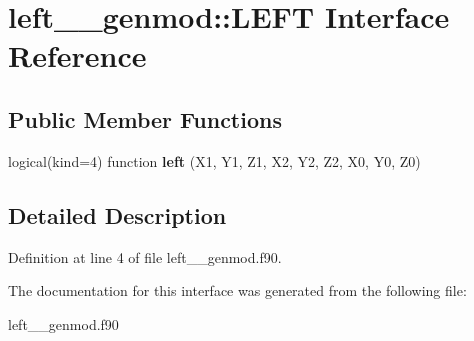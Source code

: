 \hypertarget{interfaceleft____genmod_1_1_l_e_f_t}{\section{left\+\_\+\+\_\+genmod\+:\+:L\+E\+F\+T Interface Reference}
\label{interfaceleft____genmod_1_1_l_e_f_t}
}
\subsection*{Public Member Functions}
\begin{DoxyCompactItemize}
\item 
\hypertarget{interfaceleft____genmod_1_1_l_e_f_t_a99a80d3422c67614bf6a42303e9c5c0f}{logical(kind=4) function {\bfseries left} (X1, Y1, Z1, X2, Y2, Z2, X0, Y0, Z0)}\label{interfaceleft____genmod_1_1_l_e_f_t_a99a80d3422c67614bf6a42303e9c5c0f}

\end{DoxyCompactItemize}


\subsection{Detailed Description}


Definition at line 4 of file left\+\_\+\+\_\+genmod.\+f90.



The documentation for this interface was generated from the following file\+:\begin{DoxyCompactItemize}
\item 
left\+\_\+\+\_\+genmod.\+f90\end{DoxyCompactItemize}
